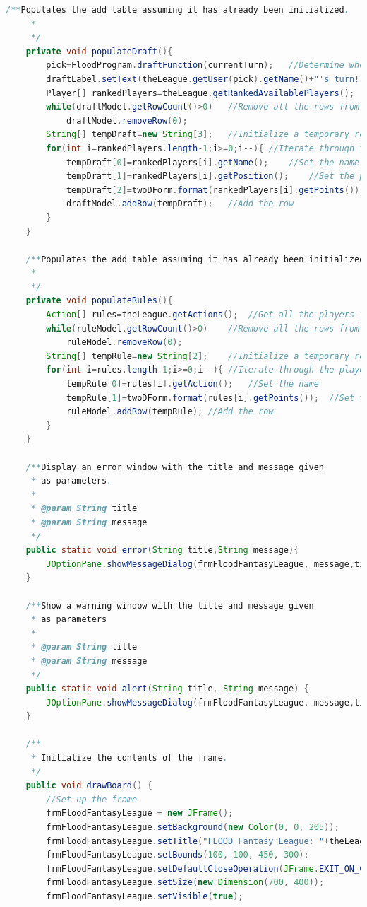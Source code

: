 \documentclass[12pt]{report}
\begin{document}
\begin{singlespace}
\begin{lstlisting}[language=Java,label=some-code,caption={GUI.java}]
	/**Populates the add table assuming it has already been initialized.
	 * 
	 */
	private void populateDraft(){
		pick=FloodProgram.draftFunction(currentTurn);	//Determine who is picking next
		draftLabel.setText(theLeague.getUser(pick).getName()+"'s turn!");	//Figure out which user is picking next
		Player[] rankedPlayers=theLeague.getRankedAvailablePlayers();	//Get all the players in reverse ranked order
		while(draftModel.getRowCount()>0)	//Remove all the rows from the add table
			draftModel.removeRow(0);
		String[] tempDraft=new String[3];	//Initialize a temporary row
		for(int i=rankedPlayers.length-1;i>=0;i--){	//Iterate through the players
			tempDraft[0]=rankedPlayers[i].getName();	//Set the name
			tempDraft[1]=rankedPlayers[i].getPosition();	//Set the position
			tempDraft[2]=twoDForm.format(rankedPlayers[i].getPoints());	//Set the points scored all season
			draftModel.addRow(tempDraft);	//Add the row
		}
	}
	
	/**Populates the add table assuming it has already been initialized.
	 * 
	 */
	private void populateRules(){
		Action[] rules=theLeague.getActions();	//Get all the players in reverse ranked order
		while(ruleModel.getRowCount()>0)	//Remove all the rows from the add table
			ruleModel.removeRow(0);
		String[] tempRule=new String[2];	//Initialize a temporary row
		for(int i=rules.length-1;i>=0;i--){	//Iterate through the players
			tempRule[0]=rules[i].getAction();	//Set the name
			tempRule[1]=twoDForm.format(rules[i].getPoints());	//Set the points scored all season
			ruleModel.addRow(tempRule);	//Add the row
		}
	}
	
	/**Display an error window with the title and message given
	 * as parameters.
	 * 
	 * @param String title
	 * @param String message
	 */
	public static void error(String title,String message){
		JOptionPane.showMessageDialog(frmFloodFantasyLeague, message,title,JOptionPane.ERROR_MESSAGE);
	}
	
	/**Show a warning window with the title and message given
	 * as parameters
	 * 
	 * @param String title
	 * @param String message
	 */
	public static void alert(String title, String message) {
		JOptionPane.showMessageDialog(frmFloodFantasyLeague, message,title,JOptionPane.WARNING_MESSAGE);
	}
	
	/**
	 * Initialize the contents of the frame.
	 */
	public void drawBoard() {
		//Set up the frame
		frmFloodFantasyLeague = new JFrame();
		frmFloodFantasyLeague.setBackground(new Color(0, 0, 205));
		frmFloodFantasyLeague.setTitle("FLOOD Fantasy League: "+theLeague.getName());
		frmFloodFantasyLeague.setBounds(100, 100, 450, 300);
		frmFloodFantasyLeague.setDefaultCloseOperation(JFrame.EXIT_ON_CLOSE);
		frmFloodFantasyLeague.setSize(new Dimension(700, 400));
		frmFloodFantasyLeague.setVisible(true);
		

\end{lstlisting}
\end{singlespace}
\end{document}

